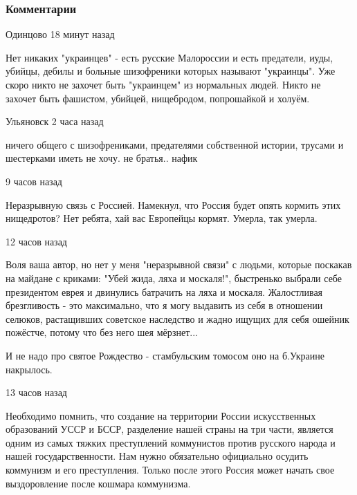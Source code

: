  
 
 
 
 
\subsubsection{Комментарии}

\begin{itemize}

 Одинцово 18 минут назад  

Нет никаких "украинцев" - есть русские Малороссии и есть предатели, иуды,
убийцы, дебилы и больные шизофреники которых называют "украинцы". Уже скоро
никто не захочет быть "украинцем" из нормальных людей. Никто не захочет быть
фашистом, убийцей, нищебродом, попрошайкой и холуём.

 Ульяновск 2 часа назад  

ничего общего с шизофрениками, предателями собственной истории, трусами и
шестерками иметь не хочу. не братья.. нафик

 9 часов назад  

Неразрывную связь с Россией. Намекнул, что Россия будет опять кормить этих
нищедротов? Нет ребята, хай вас Европейцы кормят. Умерла, так умерла.

 12 часов назад  

Воля ваша автор, но нет у меня "неразрывной связи" с людьми, которые поскакав
на майдане с криками: "Убей жида, ляха и москаля!", быстренько выбрали себе
президентом еврея и двинулись батрачить на ляха и москаля. Жалостливая
брезгливость - это максимально, что я могу выдавить из себя в отношении
селюков, растащивших советское наследство и жадно ищущих для себя ошейник
пожёстче, потому что без него шея мёрзнет...

И не надо про святое Рождество - стамбульским томосом оно на б.Украине
накрылось.

 13 часов назад  

Необходимо помнить, что создание на территории России искусственных образований
УССР и БССР, разделение нашей страны на три части, является
одним из самых тяжких преступлений коммунистов против русского
народа и нашей государственности. Нам нужно обязательно
официально осудить коммунизм и его преступления. Только после
этого Россия может начать свое выздоровление после кошмара
коммунизма.


\end{itemize}
